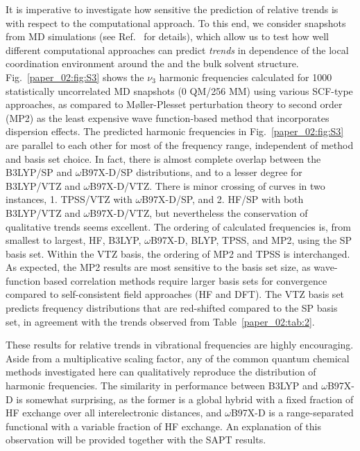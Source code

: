\documentclass[%
  class = book,%
  crop = false,%
  float = true,%
  multi = true,%
  preview = false,%
]{standalone}
\let\cite\autocite
\begin{document}
It is imperative to investigate how sensitive the prediction of relative trends is with respect to the computational approach. To this end, we consider snapshots from MD simulations (see Ref.~\parencite{Daly2016} for details), which allow us to test how well different computational approaches can predict \emph{trends} in dependence of the local coordination environment around the  and the bulk solvent structure. Fig.~\ref{paper_02:fig:S3} shows the  \(\nu_{3}\) harmonic frequencies calculated for \num{1000} statistically uncorrelated MD snapshots (0 QM/256 MM) using various SCF-type approaches, as compared to Møller-Plesset perturbation theory to second order (MP2) as the least expensive wave function-based method that incorporates dispersion effects.\cite{WCMS:WCMS58} The predicted harmonic frequencies in Fig.~\ref{paper_02:fig:S3} are parallel to each other for most of the frequency range, independent of method and basis set choice. In fact, there is almost complete overlap between the B3LYP/SP and \(\omega\)B97X-D/SP distributions, and to a lesser degree for B3LYP/VTZ and \(\omega\)B97X-D/VTZ. There is minor crossing of curves in two instances, 1. TPSS/VTZ with \(\omega\)B97X-D/SP, and 2. HF/SP with both B3LYP/VTZ and \(\omega\)B97X-D/VTZ, but nevertheless the conservation of qualitative trends seems excellent. The ordering of calculated frequencies is, from smallest to largest, HF, B3LYP, \(\omega\)B97X-D, BLYP, TPSS, and MP2, using the SP basis set. Within the VTZ basis, the ordering of MP2 and TPSS is interchanged. As expected, the MP2 results are most sensitive to the basis set size, as wave-function based correlation methods require larger basis sets for convergence compared to self-consistent field approaches (HF and DFT). The VTZ basis set predicts frequency distributions that are red-shifted compared to the SP basis set, in agreement with the trends observed from Table~\ref{paper_02:tab:2}.

These results for relative trends in vibrational frequencies are highly encouraging. Aside from a multiplicative scaling factor, any of the common quantum chemical methods investigated here can qualitatively reproduce the distribution of harmonic frequencies. The similarity in performance between B3LYP and \(\omega\)B97X-D is somewhat surprising, as the former is a global hybrid with a fixed fraction of HF exchange over all interelectronic distances, and \(\omega\)B97X-D is a range-separated functional with a variable fraction of HF exchange. An explanation of this observation will be provided together with the SAPT results.
\end{document}
